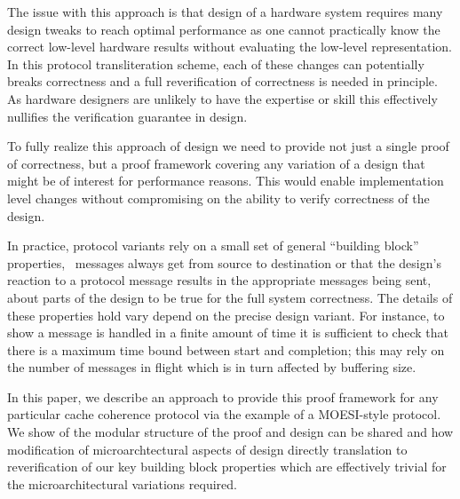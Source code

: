 The issue with this approach is that design of a hardware system
requires many design tweaks to reach optimal performance as one cannot
practically know the correct low-level hardware results without
evaluating the low-level representation. In this protocol
transliteration scheme, each of these changes can potentially breaks
correctness and a full reverification of correctness is needed in
principle. As hardware designers are unlikely to have the expertise or
skill this effectively nullifies the verification guarantee in design.

To fully realize this approach of design we need to provide not just a
single proof of correctness, but a proof framework covering any
variation of a design that might be of interest for performance
reasons. This would enable implementation level changes without
compromising on the ability to verify correctness of the design.

In practice, protocol variants rely on a small set of general
``building block'' properties, \eg\ messages always get from source to
destination or that the design's reaction to a protocol message
results in the appropriate messages being sent, about parts of the
design to be true for the full system correctness. The details of
these properties hold vary depend on the precise design variant. For
instance, to show a message is handled in a finite amount of time it
is sufficient to check that there is a maximum time bound between
start and completion; this may rely on the number of messages in
flight which is in turn affected by buffering size.

In this paper, we describe an approach to provide this proof framework
for any particular cache coherence protocol via the example of a
MOESI-style protocol. We show of the modular structure of the proof
and design can be shared and how modification of microarchtectural
aspects of design directly translation to reverification of our key
building block properties which are effectively trivial for the
microarchitectural variations required. 


